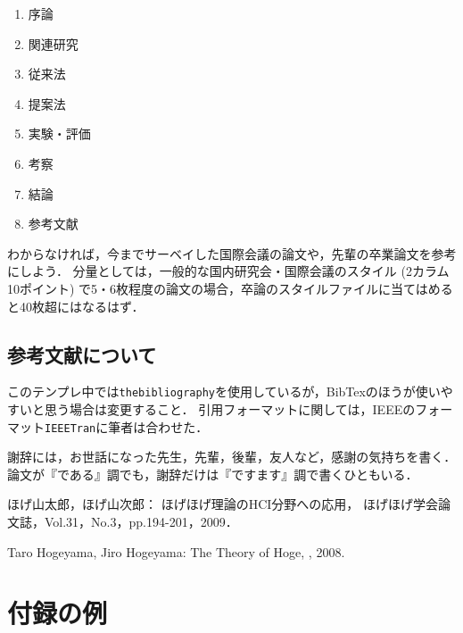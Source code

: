 \begin{enumerate}
	\item 序論
	\item 関連研究
	\item 従来法
	\item 提案法
	\item 実験・評価
	\item 考察
	\item 結論
	\item 参考文献
\end{enumerate}

わからなければ，今までサーベイした国際会議の論文や，先輩の卒業論文を参考にしよう．
分量としては，一般的な国内研究会・国際会議のスタイル (2カラム10ポイント) で5・6枚程度の論文の場合，卒論のスタイルファイルに当てはめると40枚超にはなるはず．

\section{参考文献について}
このテンプレ中では{\tt thebibliography}を使用しているが，BibTexのほうが使いやすいと思う場合は変更すること．
引用フォーマットに関しては，IEEEのフォーマット{\tt IEEETran}に筆者は合わせた．

\begin{acknowledgment}

謝辞には，お世話になった先生，先輩，後輩，友人など，感謝の気持ちを書く．論文が『である』調でも，謝辞だけは『ですます』調で書くひともいる．

\end{acknowledgment}

\begin{bib}[100]


  ほげ山太郎，ほげ山次郎：
  \newblock ほげほげ理論のHCI分野への応用，
  \newblock ほげほげ学会論文誌，Vol.31，No.3，pp.194-201，2009．

  Taro Hogeyama, Jiro Hogeyama:
  \newblock The Theory of Hoge,
  , 2008.
	
\end{bib}

\appendix
\chapter{付録の例}

